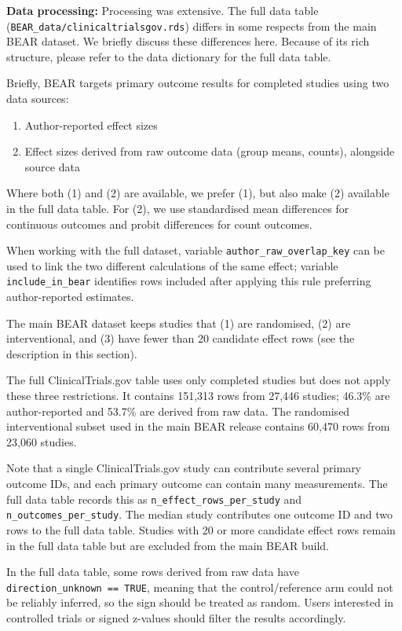 \documentclass[
  11pt,
]{article}
\providecommand{\tightlist}{%
  \setlength{\itemsep}{0pt}\setlength{\parskip}{0pt}}
\begin{document}
\textbf{Data processing:} Processing was extensive. The full data table
(\texttt{BEAR\_data/clinicaltrialsgov.rds}) differs in some respects
from the main BEAR dataset. We briefly discuss these differences here.
Because of its rich structure, please refer to the data dictionary for
the full data table.

Briefly, BEAR targets primary outcome results for completed studies
using two data sources:

\begin{enumerate}
\def\labelenumi{(\arabic{enumi})}
\tightlist
\item
  Author-reported effect sizes
\item
  Effect sizes derived from raw outcome data (group means, counts),
  alongside source data
\end{enumerate}

Where both (1) and (2) are available, we prefer (1), but also make (2)
available in the full data table. For (2), we use standardised mean
differences for continuous outcomes and probit differences for count
outcomes.

When working with the full dataset, variable
\texttt{author\_raw\_overlap\_key} can be used to link the two different
calculations of the same effect; variable \texttt{include\_in\_bear}
identifies rows included after applying this rule preferring
author-reported estimates.

The main BEAR dataset keeps studies that (1) are randomised, (2) are
interventional, and (3) have fewer than 20 candidate effect rows (see
the description in this section).

The full ClinicalTrials.gov table uses only completed studies but does
not apply these three restrictions. It contains 151,313 rows from 27,446
studies; 46.3\% are author-reported and 53.7\% are derived from raw
data. The randomised interventional subset used in the main BEAR release
contains 60,470 rows from 23,060 studies.

Note that a single ClinicalTrials.gov study can contribute several
primary outcome IDs, and each primary outcome can contain many
measurements. The full data table records this as
\texttt{n\_effect\_rows\_per\_study} and
\texttt{n\_outcomes\_per\_study}. The median study contributes one
outcome ID and two rows to the full data table. Studies with 20 or more
candidate effect rows remain in the full data table but are excluded
from the main BEAR build.

In the full data table, some rows derived from raw data have
\texttt{direction\_unknown\ ==\ TRUE}, meaning that the
control/reference arm could not be reliably inferred, so the sign should
be treated as random. Users interested in controlled trials or signed
z-values should filter the results accordingly.
\end{document}

